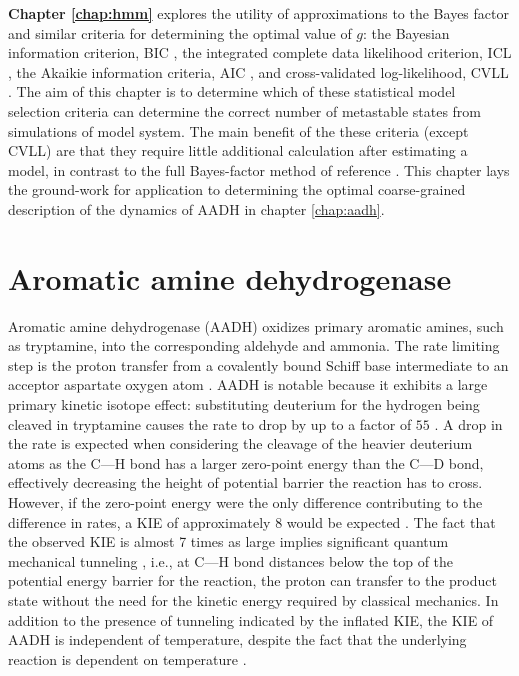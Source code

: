 \textbf{Chapter \ref{chap:hmm}} explores the utility of approximations to the Bayes factor and similar criteria for determining the optimal value of $g$: the Bayesian information criterion, BIC \cite{schwarzEstimatingDimensionModel1978a}, the integrated complete data likelihood criterion, ICL \cite{biernackiAssessingMixtureModel2000a}, the Akaikie information criteria, AIC \cite{akaikeInformationTheoryExtension1998}, and cross-validated log-likelihood, CVLL \cite{celeuxSelectingHiddenMarkov2008}. The aim of this chapter is to determine which of these statistical model selection criteria can determine the correct number of metastable states from simulations of  model system. The main benefit of the these criteria (except CVLL) are that they require little additional calculation after estimating a model, in contrast to the full Bayes-factor method of reference \cite{bacalladoBayesianComparisonMarkov2009a}.  This chapter lays the ground-work for application to determining the optimal coarse-grained description of the dynamics of AADH in chapter \ref{chap:aadh}. 


\section{Aromatic amine dehydrogenase}

Aromatic amine dehydrogenase (AADH) oxidizes primary aromatic amines, such as tryptamine, into the corresponding aldehyde and ammonia. The rate limiting step is the proton transfer from a covalently bound Schiff base intermediate to an acceptor aspartate oxygen atom \cite{masgrauAtomicDescriptionEnzyme2006}.  AADH is notable because it exhibits a large primary kinetic isotope effect: substituting deuterium for the hydrogen being cleaved in tryptamine causes the rate to drop by up to a factor of $55$ \cite{masgrauAtomicDescriptionEnzyme2006}.  A drop in the rate is expected when considering the cleavage of the heavier deuterium atoms as the C---H bond has a larger zero-point energy than the C---D bond, effectively decreasing the height of potential barrier the reaction has to cross. However, if the zero-point energy were the only difference contributing to the difference in rates, a KIE of approximately \num{8} would be expected \cite{antoniouLargeKineticIsotope1997}.  The fact that the observed KIE is almost \num{7} times as large implies significant quantum mechanical tunneling \cite{masgrauAtomicDescriptionEnzyme2006, klinmanbeyond2009, basranImportanceBarrierShape2001a}, i.e., at C---H bond distances below the top of the potential energy barrier for the reaction, the proton can transfer to the product state without the need for the kinetic energy required by classical mechanics.  In addition to the presence of tunneling indicated by the inflated KIE, the KIE of AADH is independent of temperature, despite the fact that the underlying reaction is dependent on temperature \cite{masgrauAtomicDescriptionEnzyme2006}. 


